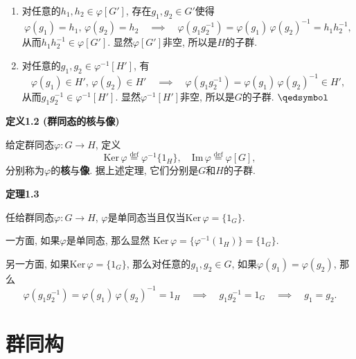 \documentclass[UTF8]{ctexart}
\begin{document}

\begin{enumerate}
    \item 对任意的$h_1,h_2\in\varphi[G']$, 存在$g_1,g_2\in G'$使得
    \[
        \varphi(g_1)=h_1,\,\varphi(g_2)=h_2\quad\implies\quad
        \varphi(g_1g_2^{-1})=\varphi(g_1)\,\varphi(g_2)^{-1}=h_1h_2^{-1},
    \]
    从而$h_1h_2^{-1}\in\varphi[G']$. 显然$\varphi[G']$非空, 所以是$H$的子群.
    \item 对任意的$g_1,g_2\in\varphi^{-1}[H']$, 有
    \[
        \varphi(g_1)\in H',\,\varphi(g_2)\in H'\quad\implies\quad
        \varphi(g_1g_2^{-1})=\varphi(g_1)\,\varphi(g_2)^{-1}\in H',
    \]
    从而$g_1g_2^{-1}\in\varphi^{-1}[H']$.
    显然$\varphi^{-1}[H']$非空, 所以是$G$的子群. \hfill $\qedsymbol$
\end{enumerate}

\vspace{10pt}

\hypertarget{sec:定义1.2}{}
\noindent\textbf{定义1.2 (群同态的核与像)}

给定群同态$\varphi:G\to H$, 定义
\[
    \mathrm{Ker}\,\varphi\overset{\mathrm{def}}{=}\varphi^{-1}\{1_H\},
    \quad\mathrm{Im}\,\varphi\overset{\mathrm{def}}{=}\varphi[G],
\]
分别称为$\varphi$的\textbf{核}与\textbf{像}.
据上述定理, 它们分别是$G$和$H$的子群.

\vspace{10pt}

\hypertarget{sec:定理1.3}{}
\noindent\textbf{定理1.3}

任给群同态$\varphi:G\to H$, $\varphi$是单同态当且仅当$\mathrm{Ker}\,\varphi=\{1_G\}$.


一方面, 如果$\varphi$是单同态, 那么显然
$\mathrm{Ker}\,\varphi=\{\varphi^{-1}(1_H)\}=\{1_G\}$.

另一方面, 如果$\mathrm{Ker}\,\varphi=\{1_G\}$, 那么对任意的$g_1,g_2\in G$,
如果$\varphi(g_1)=\varphi(g_2)$, 那么
\begin{equation*}
    \varphi(g_1g_2^{-1})=\varphi(g_1)\,\varphi(g_2)^{-1}=1_H\quad\implies\quad
    g_1g_2^{-1}=1_G\quad\implies\quad g_1=g_2.
\tag*{\qedsymbol}\end{equation*}





\newpage

\section{群同构}
\end{document}
